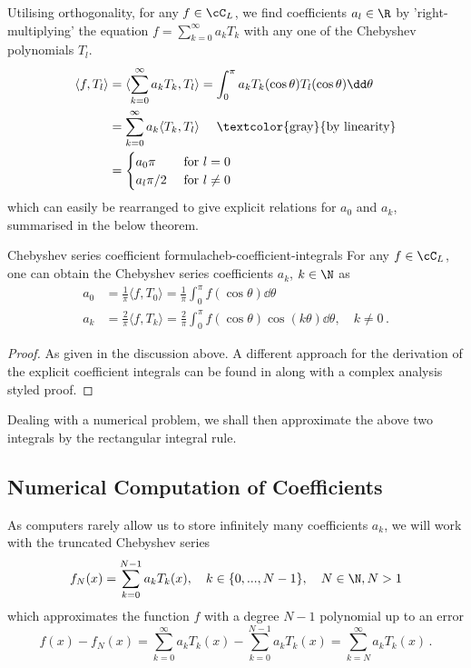 \documentclass[12pt, a4paper]{article}
\begin{document}
  Utilising orthogonality, for any $f \in \cC_L$, we find coefficients $a_l \in \R$ by 'right-multiplying' the equation $f = \sum_{k=0}^\infty a_k T_k$ with any one of the Chebyshev polynomials $T_l$.
  \begin{align*}
    \langle f, T_l \rangle & = \langle \sum_{k=0}^\infty a_k T_k, T_l \rangle = \int_0^\pi a_k T_k(\cos \theta) T_l(\cos \theta) \dd\theta \\
                           & = \sum_{k=0}^\infty a_k \langle T_k, T_l \rangle \quad \text{ \textcolor{gray}{by linearity}}                 \\
                           & = \begin{cases}
                                 a_0 \pi   & \text{ for } l = 0    \\
                                 a_l \pi/2 & \text{ for } l \neq 0
                               \end{cases}
  \end{align*}
  which can easily be rearranged to give explicit relations for $a_0$ and $a_k$, summarised in the below theorem.
  \begin{theorem}{Chebyshev series coefficient formula}{cheb-coefficient-integrals}
    For any $f \in \cC_L$, one can obtain the Chebyshev series coefficients $a_k$, $k \in \N$ as
    \begin{align*}
      a_0 & = \frac{1}{\pi} \langle f, T_0 \rangle =  \frac{1}{\pi} \int_0^\pi f(\cos \theta) \dd\theta                                   \\
      a_k & = \frac{2}{\pi} \langle f, T_k \rangle = \frac{2}{\pi} \int_0^\pi f(\cos \theta) \cos(k \theta) \dd\theta, \quad k \neq 0 \,.
    \end{align*}
  \end{theorem}
  \begin{proof}
    As given in the discussion above.
    A different approach for the derivation of the explicit coefficient integrals can be found in \cite{atap} along with a complex analysis styled proof.
  \end{proof}

  Dealing with a numerical problem, we shall then approximate the above two integrals by the rectangular integral rule.

  \subsection{Numerical Computation of Coefficients}
  \label{subsection:numerical-coeffs}
  As computers rarely allow us to store infinitely many coefficients $a_k$, we will work with the truncated Chebyshev series
  \begin{equation}
    f_N(x) = \sum_{k=0}^{N-1} a_k T_k(x), \quad k \in \{0, ..., N-1\},\quad N \in \N, N > 1
    \label{eq:truncated-cheb-series}
  \end{equation}
  which approximates the function $f$ with a degree $N-1$ polynomial up to an error
  $$f(x) - f_N(x) = \sum_{k=0}^{\infty} a_k T_k(x) - \sum_{k=0}^{N-1} a_k T_k(x) = \sum_{k=N}^{\infty} a_k T_k(x) \,.$$
\end{document}
